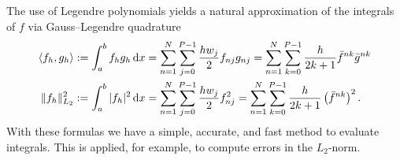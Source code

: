 The use of Legendre polynomials yields a natural approximation of the integrals of $f$
via Gauss--Legendre quadrature
\begin{subequations}
\begin{align}
    \langle f_h,g_h\rangle:=\int_a^b f_hg_h \,\mathrm{d}x &= \sum_{n=1}^N\sum_{j=0}^{P-1} \frac{hw_j}{2} f_{nj} g_{nj} 
    = \sum_{n=1}^N\sum_{k=0}^{P-1}\frac{h}{2k+1}\bar f^{nk}\bar g^{nk}  \\
    \|f_h\|^2_{L_2} := \int_a^b |f_h|^2 \,\mathrm{d}x &= \sum_{n=1}^N\sum_{j=0}^{P-1} \frac{h w_j}{2}f_{nj}^2 
    = \sum_{n=1}^N\sum_{k=0}^{P-1} \frac{h}{2k+1}\left(\bar f^{nk}\right)^2. 
    \label{eq:def_norm}
\end{align}
\label{eq:gausslegendre}
\end{subequations}
With these formulas we have a simple, accurate, and fast 
method to evaluate integrals. This is applied, for example, to compute
errors in the $L_2$-norm.

